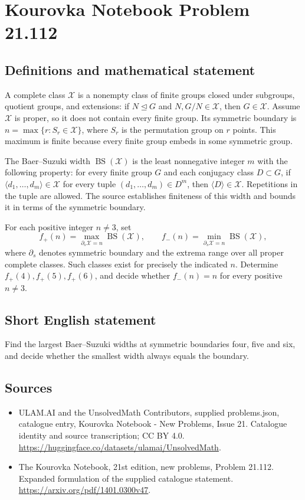 \documentclass[11pt,a4paper]{article}
\begin{document}
\section*{Kourovka Notebook Problem 21.112}\label{statement}

\subsection{Definitions and mathematical statement}
A complete class $\mathcal X$ is a nonempty class of finite groups closed under
subgroups, quotient groups, and extensions: if $N\trianglelefteq G$ and
$N,G/N\in\mathcal X$, then $G\in\mathcal X$.
Assume $\mathcal X$ is proper, so it does not contain every finite group.
Its symmetric boundary is $n=\max\{r:S_r\in\mathcal X\}$, where $S_r$ is
the permutation group on $r$ points. This maximum is finite because every
finite group embeds in some symmetric group.

The Baer--Suzuki width $\operatorname{BS}(\mathcal X)$ is the least
nonnegative integer $m$ with the following property: for every finite group
$G$ and each conjugacy class $D\subset G$, if
$\langle d_1,\ldots,d_m\rangle\in\mathcal X$ for every tuple
$(d_1,\ldots,d_m)\in D^m$, then $\langle D\rangle\in\mathcal X$.
Repetitions in the tuple are allowed. The source establishes finiteness of
this width and bounds it in terms of the symmetric boundary.

For each positive integer $n\ne3$, set
\[
f_+(n)=\max_{\partial_s\mathcal X=n}\operatorname{BS}(\mathcal X),\qquad
f_-(n)=\min_{\partial_s\mathcal X=n}\operatorname{BS}(\mathcal X),
\]
where $\partial_s$ denotes symmetric boundary and the extrema range over all
proper complete classes. Such classes exist for precisely the indicated $n$.
Determine $f_+(4),f_+(5),f_+(6)$, and decide whether $f_-(n)=n$ for every
positive $n\ne3$.
\subsection{Short English statement}
Find the largest Baer--Suzuki widths at symmetric boundaries four, five and six, and decide whether the smallest width always equals the boundary.
\subsection{Sources}
\begin{itemize}
\item[S1] ULAM.AI and the UnsolvedMath Contributors, supplied problems.json, catalogue entry, Kourovka Notebook - New Problems, Issue 21. Catalogue identity and source transcription; CC BY 4.0.
\url{https://huggingface.co/datasets/ulamai/UnsolvedMath}.
\item[S2] The Kourovka Notebook, 21st edition, new problems, Problem 21.112. Expanded formulation of the supplied catalogue statement.
\url{https://arxiv.org/pdf/1401.0300v47}.
\end{itemize}
\end{document}
